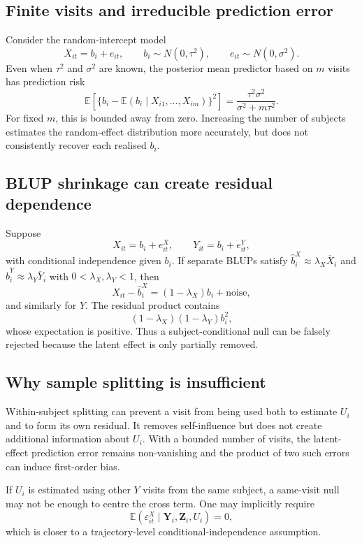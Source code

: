 \documentclass[11pt]{article}
\theoremstyle{definition}
\newcommand{\E}{\mathbb{E}}
\begin{document}
\subsection{Finite visits and irreducible prediction error}

Consider the random-intercept model
\[
X_{it}=b_i+e_{it},
\qquad
b_i\sim N(0,\tau^2),
\qquad
e_{it}\sim N(0,\sigma^2).
\]
Even when $\tau^2$ and $\sigma^2$ are known, the posterior mean predictor based on $m$ visits
has prediction risk
\[
\E\left[\{b_i-\E(b_i\mid X_{i1},\ldots,X_{im})\}^2\right]
=
\frac{\tau^2\sigma^2}{\sigma^2+m\tau^2}.
\]
For fixed $m$, this is bounded away from zero. Increasing the number of subjects estimates the
random-effect distribution more accurately, but does not consistently recover each realised
$b_i$.

\subsection{BLUP shrinkage can create residual dependence}

Suppose
\[
X_{it}=b_i+e^X_{it},
\qquad
Y_{it}=b_i+e^Y_{it},
\]
with conditional independence given $b_i$. If separate BLUPs satisfy
$\widehat b_i^X\approx\lambda_X\overline X_i$ and
$\widehat b_i^Y\approx\lambda_Y\overline Y_i$ with $0<\lambda_X,\lambda_Y<1$, then
\[
X_{it}-\widehat b_i^X
=(1-\lambda_X)b_i+\text{noise},
\]
and similarly for $Y$. The residual product contains
\[
(1-\lambda_X)(1-\lambda_Y)b_i^2,
\]
whose expectation is positive. Thus a subject-conditional null can be falsely rejected because
the latent effect is only partially removed.

\subsection{Why sample splitting is insufficient}

Within-subject splitting can prevent a visit from being used both to estimate $U_i$ and to
form its own residual. It removes self-influence but does not create additional information
about $U_i$. With a bounded number of visits, the latent-effect prediction error remains
non-vanishing and the product of two such errors can induce first-order bias.

If $U_i$ is estimated using other $Y$ visits from the same subject, a same-visit null
may not be enough to centre the cross term. One may implicitly require
\[
\E(\varepsilon^X_{it}\mid\mathbf Y_i,\mathbf Z_i,U_i)=0,
\]
which is closer to a trajectory-level conditional-independence assumption.
\end{document}
